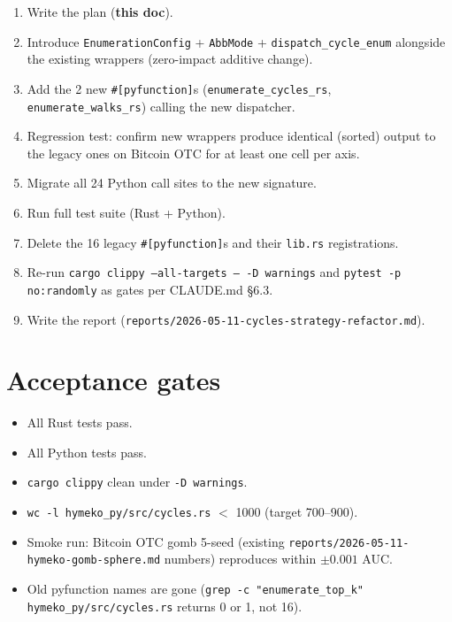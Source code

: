 \documentclass[11pt]{article}
\begin{document}
\begin{enumerate}
  \item Write the plan (\textbf{this doc}).
  \item Introduce \texttt{EnumerationConfig} + \texttt{AbbMode} +
    \texttt{dispatch\_cycle\_enum} alongside the existing wrappers
    (zero-impact additive change).
  \item Add the 2 new \texttt{\#[pyfunction]}s (\texttt{enumerate\_cycles\_rs},
    \texttt{enumerate\_walks\_rs}) calling the new dispatcher.
  \item Regression test: confirm new wrappers produce identical
    (sorted) output to the legacy ones on Bitcoin OTC for at least
    one cell per axis.
  \item Migrate all 24 Python call sites to the new signature.
  \item Run full test suite (Rust + Python).
  \item Delete the 16 legacy \texttt{\#[pyfunction]}s and their
    \texttt{lib.rs} registrations.
  \item Re-run \texttt{cargo clippy --all-targets -- -D warnings} and
    \texttt{pytest -p no:randomly} as gates per CLAUDE.md \S 6.3.
  \item Write the report (\texttt{reports/2026-05-11-cycles-strategy-refactor.md}).
\end{enumerate}

\section{Acceptance gates}

\begin{itemize}
  \item All Rust tests pass.
  \item All Python tests pass.
  \item \texttt{cargo clippy} clean under \texttt{-D warnings}.
  \item \texttt{wc -l hymeko\_py/src/cycles.rs} $<$ 1000 (target 700--900).
  \item Smoke run: Bitcoin OTC gomb 5-seed (existing
    \texttt{reports/2026-05-11-hymeko-gomb-sphere.md} numbers) reproduces
    within $\pm 0.001$ AUC.
  \item Old pyfunction names are gone (\texttt{grep -c "enumerate\_top\_k"
    hymeko\_py/src/cycles.rs} returns 0 or 1, not 16).
\end{itemize}
\end{document}
